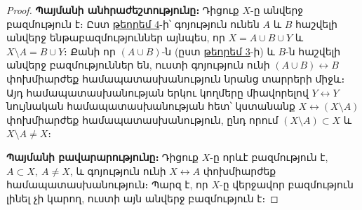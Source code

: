 \documentclass[./main.tex]{subfiles}
\begin{document}
\begin{proof}
\textbf{Պայմանի անհրաժեշտությունը։} Դիցուք $X$-ը անվերջ բազմություն է։ Ըստ \hyperref[ch3thm4]{թեորեմ 4}-ի՝ գոյություն ունեն $A$ և $B$ հաշվելի անվերջ ենթաբազմություններ այնպես, որ $X=A\cup B \cup Y$ և $X\setminus A=B\cup Y$։ Քանի որ $(A\cup  B)$-ն (ըստ \hyperref[ch3thm3]{թեորեմ 3}-ի) և $B$-ն հաշվելի անվերջ բազմություններ են, ուստի գոյություն ունի $(A\cup  B)\leftrightarrow B$ փոխմիարժեք համապատասխանություն նրանց տարրերի միջև։ Այդ համա\-պա\-տաս\-խանության երկու կողմերը միավորելով $Y\leftrightarrow Y$ նույնական համա\-պա\-տաս\-խա\-նու\-թյան հետ՝ կստա\-նանք $X\leftrightarrow (X\setminus A)$ փոխմիարժեք համապատասխանություն, ընդ որում $(X\setminus A)\subset X$ և $X\setminus A\neq X$։
\par \textbf{Պայմանի բավարարությունը։} Դիցուք $X$-ը որևէ բազմություն է, $A\subset X,\ A\neq X$, և գոյություն ունի $X\leftrightarrow A$ փոխմիարժեք համապատասխանություն։ Պարզ է, որ $X$-ը վերջավոր բազմություն լինել չի կարող, ուստի այն անվերջ բազմություն է։
\end{proof}
\end{document}
